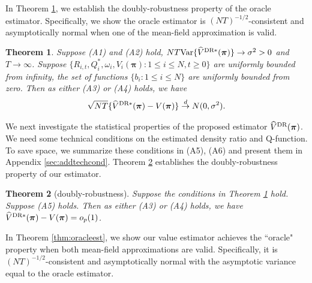 \documentclass{article}
\newcommand{\Var}{{\mbox{Var}}}
\newtheorem{thm}{Theorem}
\begin{document}
In Theorem \ref{thm:oracle}, we establish the doubly-robustness property of the oracle estimator. Specifically, we show the oracle estimator is $(NT)^{-1/2}$-consistent and asymptotically normal when one of the mean-field approximation is valid. \vspace{-0.2cm}

\begin{thm}\label{thm:oracle}
	Suppose (A1) and (A2) hold, $ NT \Var\{\widehat{V}^{\hbox{\scriptsize{DR}}*}(\bm{\pi})\}\to \sigma^2>0$ and $T\to \infty$. Suppose $\{R_{i,t}, Q_i^*, \omega_{i}, V_i(\bm{\pi}):1\le i\le N,t\ge 0\}$ are uniformly bounded from infinity, the set of functions $\{b_i:1\le i\le N\}$ are uniformly bounded from zero. Then as either (A3) or (A4) holds, we have
	\vspace{-0.2cm}
	\begin{eqnarray*}
		\sqrt{NT} \{\widehat{V}^{\hbox{\scriptsize{DR}}*}(\bm{\pi})-V(\bm{\pi})\}\stackrel{d}{\to} N(0,\sigma^2). 
	\end{eqnarray*}
\end{thm}\vspace{-0.2cm}


We next investigate the statistical properties of the proposed estimator $\widehat{V}^{\hbox{\scriptsize{DR}}}(\bm{\pi})$. We need some technical conditions on the estimated density ratio and Q-function. To save space, we summarize these conditions in (A5), (A6) and present them in Appendix \ref{sec:addtechcond}. Theorem \ref{thm:double} establishes the doubly-robustness property of our estimator. 

\vspace{-0.2cm}
\begin{thm}[doubly-robustness]\label{thm:double}
	Suppose the conditions in Theorem \ref{thm:oracle} hold. Suppose (A5) holds. Then as either (A3) or (A4) holds, we have $\widehat{V}^{\hbox{\scriptsize{DR}}*}(\bm{\pi})-V(\bm{\pi})=o_p(1)$. 
\end{thm}\vspace{-0.2cm}

In Theorem \ref{thm:oracleest}, we show our value estimator achieves the ``oracle" property when both mean-field approximations are valid. Specifically, it is $(NT)^{-1/2}$-consistent and asymptotically normal with the asymptotic variance equal to the oracle estimator. \vspace{-0.2cm}
\end{document}
